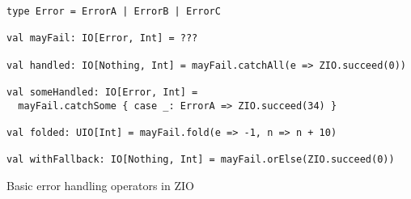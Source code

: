\begin{algorithm}

\begin{verbatim}
type Error = ErrorA | ErrorB | ErrorC

val mayFail: IO[Error, Int] = ???

val handled: IO[Nothing, Int] = mayFail.catchAll(e => ZIO.succeed(0))

val someHandled: IO[Error, Int] =
  mayFail.catchSome { case _: ErrorA => ZIO.succeed(34) }

val folded: UIO[Int] = mayFail.fold(e => -1, n => n + 10)

val withFallback: IO[Nothing, Int] = mayFail.orElse(ZIO.succeed(0))
\end{verbatim}

\caption{Basic error handling operators in ZIO \label{zio:error-handling-operators}}
\end{algorithm}